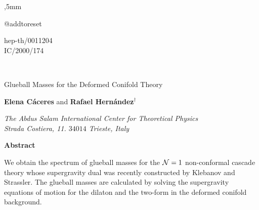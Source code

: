 \documentclass[12pt,epsf,a4paper]{article}
\begin{document}
,5mm


\def\II{\relax{\rm 1\kern-.35em1}}
\def\IP{\relax{\rm I\kern-.18em P}}
\renewcommand{\theequation}{\thesection.\arabic{equation}}
\csname @addtoreset
\def\muh{\hat \mu}
\def\nuh{\hat \nu}
\def\rhoh{\hat \rho}
\def\lambdah{\hat \lambda}
\def\sigmah{\hat \sigma}
\def\tauh{\hat \tau}

\begin{flushright}
hep-th/0011204 \\
IC/2000/174
\end{flushright}

\begin{center}

{}~\vfill

{ {\LARGE {Glueball Masses for the Deformed Conifold Theory}}}

\vspace{20 mm}


{\bf {\large {Elena C\'aceres}}} {\large and} {\bf{\large{Rafael Hern\'{a}ndez}}}$^{\dag}$

\vspace{8 mm}

{\em The Abdus Salam International Center for Theoretical Physics \\
Strada Costiera, 11. $34014$ Trieste, Italy}
\vspace{16 mm}

\end{center}



\begin{center}
{\bf Abstract}
\end{center}
  
\vspace{2 mm}
  

We obtain the spectrum of glueball masses for the ${\cal N}=1$ non-conformal 
cascade theory whose supergravity dual was recently constructed by Klebanov 
and Strassler. The glueball masses are calculated by solving the 
supergravity equations of motion for the dilaton and the two-form 
in the deformed conifold background.

\vspace{42 mm}

{\footnotesize \dag}
\end{document}

